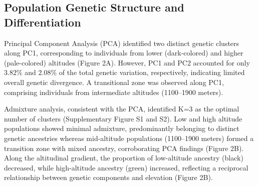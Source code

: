 \documentclass[9pt,a4paper,twoside]{rho-class/rho}
\begin{document}
\begin{table}[!h]
    \small
    \captionsetup[table]{labelsep=space, 
        justification=raggedright, singlelinecheck=off}
    \caption{Altitude, coordinates, color category and samples sizes of \textit{I. rizeensis} used in this study.}
    \label{tab:my-table}
\end{table}

    \subsection{Population Genetic Structure and Differentiation}

        Principal Component Analysis (PCA) identified two distinct genetic clusters along PC1, corresponding to individuals from lower (dark-colored) and higher (pale-colored) altitudes (Figure 2A). However, PC1 and PC2 accounted for only $3.82\%$ and $2.08\%$ of the total genetic variation, respectively, indicating limited overall genetic divergence. A transitional zone was observed along PC1, comprising individuals from intermediate altitudes (1100–1900 meters).
        
        Admixture analysis, consistent with the PCA, identified K=3 as the optimal number of clusters (Supplementary Figure S1 and S2). Low and high altitude populations showed minimal admixture, predominantly belonging to distinct genetic ancestries whereas mid-altitude populations (1100–1900 meters) formed a transition zone with mixed ancestry, corroborating PCA findings (Figure 2B). Along the altitudinal gradient, the proportion of low-altitude ancestry (black) decreased, while high-altitude ancestry (green) increased, reflecting a reciprocal relationship between genetic components and elevation (Figure 2B).
\end{document}
